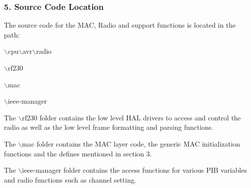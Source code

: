 \hypertarget{a00055_maccode}{}\subsubsection{5. Source Code Location}\label{a00055_maccode}
\-The source code for the \-M\-A\-C, \-Radio and support functions is located in the path\-:
\begin{DoxyItemize}
\item $\backslash$cpu$\backslash$avr$\backslash$radio
\begin{DoxyItemize}
\item $\backslash$rf230
\item $\backslash$mac
\item $\backslash$ieee-\/manager
\end{DoxyItemize}
\end{DoxyItemize}


\begin{DoxyEnumerate}
\item \-The $\backslash$rf230 folder contains the low level \-H\-A\-L drivers to access and control the radio as well as the low level frame formatting and parsing functions.
\item \-The $\backslash$mac folder contains the \-M\-A\-C layer code, the generic \-M\-A\-C initialization functions and the defines mentioned in section 3.
\item \-The $\backslash$ieee-\/manager folder contains the access functions for various \-P\-I\-B variables and radio functions such as channel setting.
\end{DoxyEnumerate}

